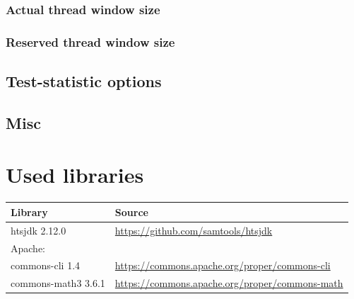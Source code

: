 \documentclass[10pt,a4paper,final]{article}
\begin{document}
\subsubsection{Actual thread window size}

\subsubsection{Reserved thread window size}

\subsection{Test-statistic options}


\subsection{Misc}


\section{Used libraries}
{\small
  \begin{tabular}{ll}
    \textbf{Library}          & \textbf{Source} \\
    \hline
    htsjdk 2.12.0             & \url{https://github.com/samtools/htsjdk} \\
    Apache:                   & \\
    \quad commons-cli 1.4     & \url{https://commons.apache.org/proper/commons-cli} \\
    \quad commons-math3 3.6.1 & \url{https://commons.apache.org/proper/commons-math}\\
  \end{tabular}
}


\end{document}
